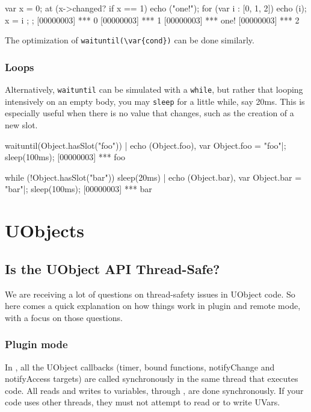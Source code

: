 \clearpage
\begin{urbiscript}
{
  var x = 0;
  at (x->changed? if x == 1)
      echo ("one!");
  for (var i : [0, 1, 2])
  {
    echo (i);
    x = i
  };
};
[00000003] *** 0
[00000003] *** 1
[00000003] *** one!
[00000003] *** 2
\end{urbiscript}

The optimization of \lstinline|waituntil(\var{cond})| can be done
similarly.

\subsubsection{Loops}

Alternatively, \lstinline|waituntil| can be simulated with a
\lstinline|while|, but rather that looping intensively on an empty
body, you may \lstinline|sleep| for a little while, say 20ms.  This is
especially useful when there is no value that changes, such as the
creation of a new slot.

\begin{urbiscript}
waituntil(Object.hasSlot("foo")) | echo (Object.foo),
var Object.foo = "foo"|;
sleep(100ms);
[00000003] *** foo
\end{urbiscript}

\begin{urbiscript}
while (!Object.hasSlot("bar"))
  sleep(20ms) |
echo (Object.bar),
var Object.bar = "bar"|;
sleep(100ms);
[00000003] *** bar
\end{urbiscript}

\section{UObjects}
\subsection{Is the UObject API Thread-Safe?}
We are receiving a lot of questions on thread-safety issues in UObject
code. So here comes a quick explanation on how things work in plugin
and remote mode, with a focus on those questions.

\subsubsection{Plugin mode}

In , all the UObject callbacks (timer, bound
functions, notifyChange and notifyAccess targets) are called
synchronously in the same thread that executes \us code. All reads and
writes to \urbi variables, through , are done
synchronously.  If
your code uses other threads, they must not attempt to read or to
write UVars.

